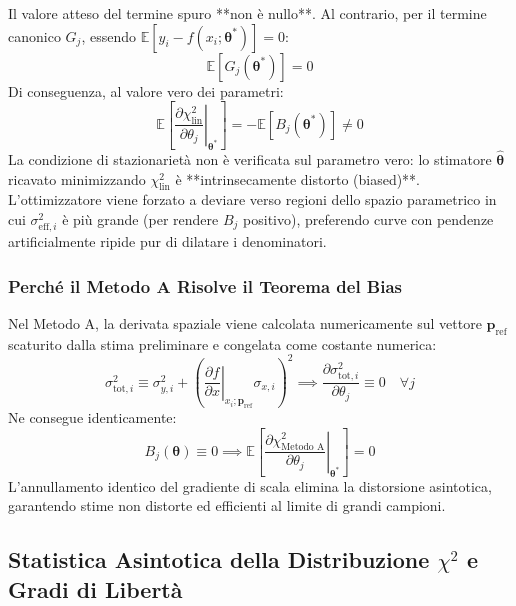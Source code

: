 \documentclass[11pt,a4paper]{article}
\begin{document}
Il valore atteso del termine spuro **non è nullo**. Al contrario, per il termine canonico $G_j$, essendo $\mathbb{E}[y_i - f(x_i; \boldsymbol{\theta}^*)] = 0$:
\begin{equation}
    \mathbb{E}\left[ G_j(\boldsymbol{\theta}^*) \right] = 0
\end{equation}
Di conseguenza, al valore vero dei parametri:
\begin{equation}
    \mathbb{E}\left[ \left.\frac{\partial \chi^2_{\text{lin}}}{\partial \theta_j}\right|_{\boldsymbol{\theta}^*} \right] = - \mathbb{E}\left[ B_j(\boldsymbol{\theta}^*) \right] \neq 0
\end{equation}
La condizione di stazionarietà non è verificata sul parametro vero: lo stimatore $\hat{\boldsymbol{\theta}}$ ricavato minimizzando $\chi^2_{\text{lin}}$ è **intrinsecamente distorto (biased)**. 
L'ottimizzatore viene forzato a deviare verso regioni dello spazio parametrico in cui $\sigma_{\text{eff}, i}^2$ è più grande (per rendere $B_j$ positivo), preferendo curve con pendenze artificialmente ripide pur di dilatare i denominatori.

\subsubsection{Perché il Metodo A Risolve il Teorema del Bias}
Nel Metodo A, la derivata spaziale viene calcolata numericamente sul vettore $\mathbf{p}_{\text{ref}}$ scaturito dalla stima preliminare e congelata come costante numerica:
\begin{equation}
    \sigma_{\text{tot}, i}^2 \equiv \sigma_{y, i}^2 + \left( \left.\frac{\partial f}{\partial x}\right|_{x_i; \mathbf{p}_{\text{ref}}} \sigma_{x, i} \right)^2 \implies \frac{\partial \sigma_{\text{tot}, i}^2}{\partial \theta_j} \equiv 0 \quad \forall j
\end{equation}
Ne consegue identicamente:
\begin{equation}
    B_j(\boldsymbol{\theta}) \equiv 0 \implies \mathbb{E}\left[ \left.\frac{\partial \chi^2_{\text{Metodo A}}}{\partial \theta_j}\right|_{\boldsymbol{\theta}^*} \right] = 0
\end{equation}
L'annullamento identico del gradiente di scala elimina la distorsione asintotica, garantendo stime non distorte ed efficienti al limite di grandi campioni.

\subsection{Statistica Asintotica della Distribuzione $\chi^2$ e Gradi di Libertà}
\end{document}
